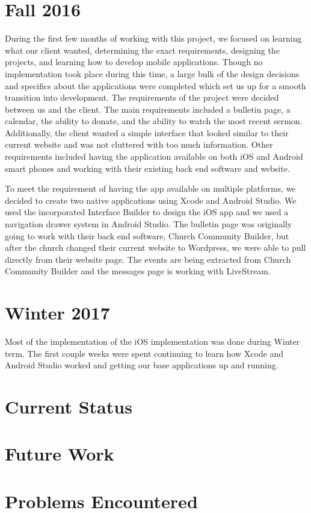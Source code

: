 \documentclass[letterpaper,10pt,draftclsnofoot,onecolumn,titlepage]{IEEEtran}
\begin{document}
\section{Fall 2016}
		During the first few months of working with this project, we focused on learning what our client wanted, determining the exact requirements, designing the projects, and learning how to develop mobile applications.
		 Though no implementation took place during this time, a large bulk of the design decisions and specifics about the applications were completed which set us up for a smooth transition into development. 
		The requirements of the project were decided between us and the client. 
		The main requirements included a bulletin page, a calendar, the ability to donate, and the ability to watch the most recent sermon. 
		Additionally, the client wanted a simple interface that looked similar to their current website and was not cluttered with too much information. 
		Other requirements included having the application available on both iOS and Android smart phones and working with their existing back end software and website. 
		
		To meet the requirement of having the app available on multiple platforms, we decided to create two native applications using Xcode and Android Studio. 
		We used the incorporated Interface Builder to design the iOS app and we used a navigation drawer system in Android Studio. 
		The bulletin page was originally going to work with their back end software, Church Community Builder, but after the church changed their current website to Wordpress, we were able to pull directly from their website page. 
		The events are being extracted from Church Community Builder and the messages page is working with LiveStream. 
	
		
\section{Winter 2017}
		Most of the implementation of the iOS implementation was done during Winter term. 
		The first couple weeks were spent continuing to learn how Xcode and Android Studio worked and getting our base applications up and running. 
		
		
\section{Current Status}

\section{Future Work}

\section{Problems Encountered}		
	




	
\end{document}
